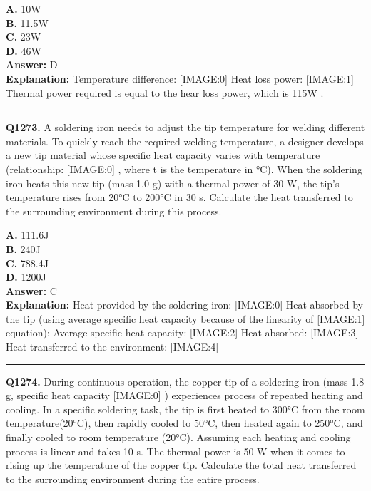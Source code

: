 \documentclass[12pt]{article}
\begin{document}
\textbf{A.} 10W \\
\textbf{B.} 11.5W \\
\textbf{C.} 23W \\
\textbf{D.} 46W \\

\textbf{Answer:} D \\
\textbf{Explanation:} Temperature difference:
[IMAGE:0]
Heat loss power:
[IMAGE:1]
Thermal power required is equal to the hear loss power, which is 115W
.

\hrule
\vspace{1em}


\noindent
\textbf{Q1273.} A soldering iron needs to adjust the tip temperature for welding different materials. To quickly reach the required welding temperature, a designer develops a new tip material whose specific heat capacity varies with temperature (relationship:
[IMAGE:0]
, where t is the temperature in °C). When the soldering iron heats this new tip (mass 1.0 g) with a thermal power of 30 W, the tip's temperature rises from 20°C to 200°C in 30 s.
Calculate the heat transferred to the surrounding environment during this process.



\textbf{A.} 111.6J \\
\textbf{B.} 240J \\
\textbf{C.} 788.4J \\
\textbf{D.} 1200J \\

\textbf{Answer:} C \\
\textbf{Explanation:} Heat provided by the soldering iron:
[IMAGE:0]
Heat absorbed by the tip (using average specific heat capacity because of the linearity of
[IMAGE:1]
equation):
Average specific heat capacity:
[IMAGE:2]
Heat absorbed:
[IMAGE:3]
Heat transferred to the environment:
[IMAGE:4]

\hrule
\vspace{1em}


\noindent
\textbf{Q1274.} During continuous operation, the copper tip of a soldering iron (mass 1.8 g, specific heat capacity
[IMAGE:0]
) experiences process of repeated heating and cooling. In a specific soldering task, the tip is first heated to 300°C from the room temperature(20°C), then rapidly cooled to 50°C, then heated again to 250°C, and finally cooled to room temperature (20°C). Assuming each heating and cooling process is linear and takes 10 s. The thermal power is 50 W when it comes to rising up the temperature of the copper tip.
Calculate the total heat transferred to the surrounding environment during the entire process.
\end{document}
